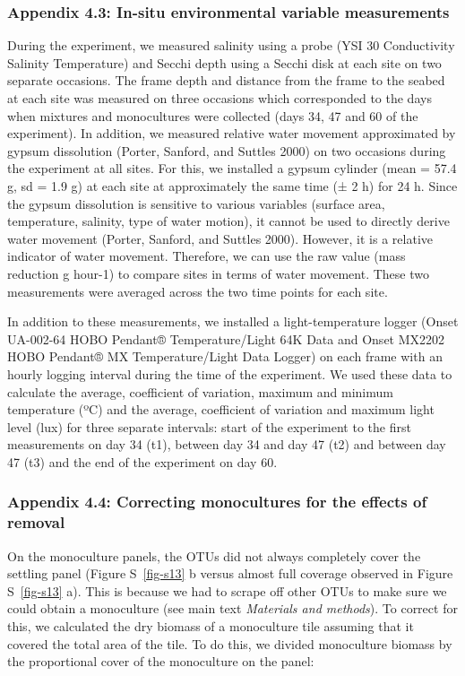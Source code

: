 \documentclass[
  letterpaper,
  DIV=11,
  numbers=noendperiod]{scrartcl}
\begin{document}
\subsubsection{Appendix 4.3: In-situ environmental variable
measurements}\label{appendix-4.3-in-situ-environmental-variable-measurements}

During the experiment, we measured salinity using a probe (YSI 30
Conductivity Salinity Temperature) and Secchi depth using a Secchi disk
at each site on two separate occasions. The frame depth and distance
from the frame to the seabed at each site was measured on three
occasions which corresponded to the days when mixtures and monocultures
were collected (days 34, 47 and 60 of the experiment). In addition, we
measured relative water movement approximated by gypsum dissolution
(Porter, Sanford, and Suttles 2000) on two occasions during the
experiment at all sites. For this, we installed a gypsum cylinder (mean
= 57.4 g, sd = 1.9 g) at each site at approximately the same time (± 2
h) for 24 h. Since the gypsum dissolution is sensitive to various
variables (surface area, temperature, salinity, type of water motion),
it cannot be used to directly derive water movement (Porter, Sanford,
and Suttles 2000). However, it is a relative indicator of water
movement. Therefore, we can use the raw value (mass reduction g hour-1)
to compare sites in terms of water movement. These two measurements were
averaged across the two time points for each site.

In addition to these measurements, we installed a light-temperature
logger (Onset UA-002-64 HOBO Pendant® Temperature/Light 64K Data and
Onset MX2202 HOBO Pendant® MX Temperature/Light Data Logger) on each
frame with an hourly logging interval during the time of the experiment.
We used these data to calculate the average, coefficient of variation,
maximum and minimum temperature (ºC) and the average, coefficient of
variation and maximum light level (lux) for three separate intervals:
start of the experiment to the first measurements on day 34 (t1),
between day 34 and day 47 (t2) and between day 47 (t3) and the end of
the experiment on day 60.

\subsubsection{Appendix 4.4: Correcting monocultures for the effects of
removal}\label{appendix-4.4-correcting-monocultures-for-the-effects-of-removal}

On the monoculture panels, the OTUs did not always completely cover the
settling panel (Figure S~\ref{fig-s13} b versus almost full coverage
observed in Figure S~\ref{fig-s13} a). This is because we had to scrape
off other OTUs to make sure we could obtain a monoculture (see main text
\emph{Materials and methods}). To correct for this, we calculated the
dry biomass of a monoculture tile assuming that it covered the total
area of the tile. To do this, we divided monoculture biomass by the
proportional cover of the monoculture on the panel:
\end{document}
